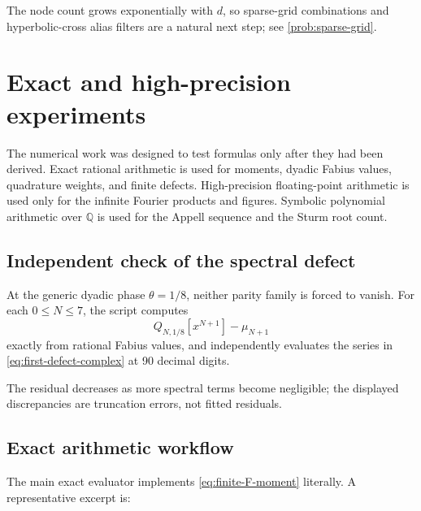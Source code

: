 \documentclass[11pt]{article}
\numberwithin{equation}{section}
\theoremstyle{definition}
\theoremstyle{remark}
\newcommand{\Q}{\mathbb Q}
\begin{document}
The node count grows exponentially with $d$, so sparse-grid combinations and hyperbolic-cross alias filters are a natural next step; see \cref{prob:sparse-grid}.

\section{Exact and high-precision experiments}
\label{sec:experiments}

The numerical work was designed to test formulas only after they had been derived.  Exact rational arithmetic is used for moments, dyadic Fabius values, quadrature weights, and finite defects.  High-precision floating-point arithmetic is used only for the infinite Fourier products and figures.  Symbolic polynomial arithmetic over $\Q$ is used for the Appell sequence and the Sturm root count.

\subsection{Independent check of the spectral defect}

At the generic dyadic phase $\theta=1/8$, neither parity family is forced to vanish.  For each $0\le N\le7$, the script computes
\[
 Q_{N,1/8}[x^{N+1}]-\mu_{N+1}
\]
exactly from rational Fabius values, and independently evaluates the series in \eqref{eq:first-defect-complex} at 90 decimal digits.

\begin{table}[H]
\centering
\caption{Independent exact-versus-spectral verification at $\theta=1/8$.  The first numerical column is obtained from exact rational arithmetic and displayed decimally; the full fractions are retained in the archive.}
\label{tab:spectral-check}

\end{table}

The residual decreases as more spectral terms become negligible; the displayed discrepancies are truncation errors, not fitted residuals.

\subsection{Exact arithmetic workflow}

The main exact evaluator implements \eqref{eq:finite-F-moment} literally.  A representative excerpt is:
\end{document}
